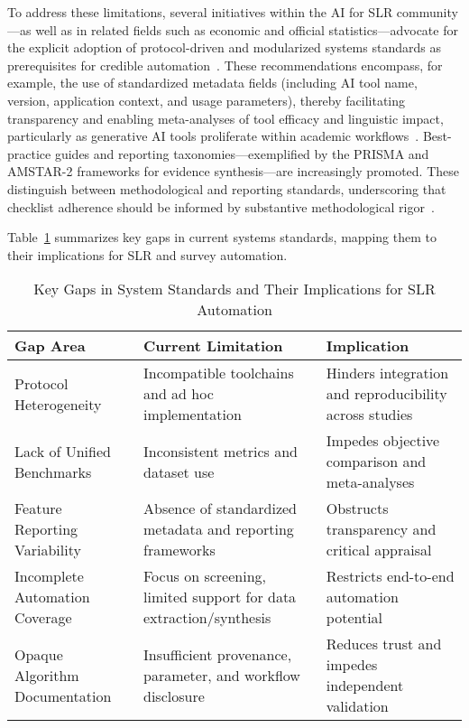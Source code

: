 \documentclass[11pt]{article}
\begin{document}
To address these limitations, several initiatives within the AI for SLR community—as well as in related fields such as economic and official statistics—advocate for the explicit adoption of protocol-driven and modularized systems standards as prerequisites for credible automation~\cite{ref30,ref37,ref43,ref51,ref61,ref89}. These recommendations encompass, for example, the use of standardized metadata fields (including AI tool name, version, application context, and usage parameters), thereby facilitating transparency and enabling meta-analyses of tool efficacy and linguistic impact, particularly as generative AI tools proliferate within academic workflows~\cite{ref98}. Best-practice guides and reporting taxonomies—exemplified by the PRISMA and AMSTAR-2 frameworks for evidence synthesis—are increasingly promoted. These distinguish between methodological and reporting standards, underscoring that checklist adherence should be informed by substantive methodological rigor~\cite{ref43,ref63,ref86,ref106}.

Table~\ref{tab:standards_gaps} summarizes key gaps in current systems standards, mapping them to their implications for SLR and survey automation.

\begin{table}[ht]
\centering
\caption{Key Gaps in System Standards and Their Implications for SLR Automation}
\label{tab:standards_gaps}
\begin{tabular}{|p{}|p{}|p{}|}
\hline
\textbf{Gap Area}         & \textbf{Current Limitation}           & \textbf{Implication} \\
\hline
Protocol Heterogeneity    & Incompatible toolchains and ad hoc implementation & Hinders integration and reproducibility across studies  \\
\hline
Lack of Unified Benchmarks & Inconsistent metrics and dataset use             & Impedes objective comparison and meta-analyses         \\
\hline
Feature Reporting Variability & Absence of standardized metadata and reporting frameworks & Obstructs transparency and critical appraisal          \\
\hline
Incomplete Automation Coverage & Focus on screening, limited support for data extraction/synthesis & Restricts end-to-end automation potential              \\
\hline
Opaque Algorithm Documentation & Insufficient provenance, parameter, and workflow disclosure & Reduces trust and impedes independent validation        \\
\hline
\end{tabular}
\end{table}
\end{document}
